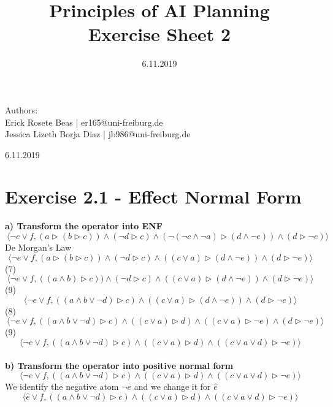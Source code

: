 \documentclass[12pt,a4paper]{article}
\title{\textbf{Principles of AI Planning
		\\{\Large Exercise Sheet 2}}}
\date{6.11.2019}
\begin{document}
	\begin{flushleft}
		Authors:\\
		Erick Rosete Beas | er165@uni-freiburg.de\\
		Jessica Lizeth Borja Diaz | jb986@uni-freiburg.de\\
	\end{flushleft}
	{\let\newpage\relax\maketitle}
	\begin{center} 
		\large 6.11.2019 
	\end{center}

	\section*{Exercise 2.1 - Effect Normal Form}
	\textbf{a) Transform the operator into ENF}\\
	\[\ \langle\neg e \lor f, (a \triangleright (b \triangleright c))  \land (\neg d \triangleright c) \land (\neg(\neg c \land \neg a) \triangleright (d \land \neg e)) \land (d \triangleright \neg e) \rangle \]	
	De Morgan's Law
	\[\ \langle\neg e \lor f, (a \triangleright (b \triangleright c))  \land (\neg d \triangleright c) \land ((c \lor a) \triangleright (d \land \neg e)) \land (d \triangleright \neg e) \rangle \]
	(7)
	\[\ \langle\neg e \lor f, ((a \land b) \triangleright c))  \land (\neg d \triangleright c) \land ((c \lor a) \triangleright (d \land \neg e)) \land (d \triangleright \neg e) \rangle \]
	(9)
	\[\ \langle\neg e \lor f, ((a \land b \lor \neg d) \triangleright c) \land ((c \lor a) \triangleright (d \land \neg e)) \land (d \triangleright \neg e) \rangle \]
	(8)
	\[\ \langle\neg e \lor f, ((a \land b \lor \neg d) \triangleright c) \land ((c \lor a) \triangleright d) \land ((c \lor a) \triangleright \neg e) \land (d \triangleright \neg e) \rangle \]
	(9)
	\[\ \langle\neg e \lor f, ((a \land b \lor \neg d) \triangleright c) \land ((c \lor a) \triangleright d) \land ((c \lor a \lor d) \triangleright \neg e) \rangle \]\\
	\textbf{b) Transform the operator into positive normal form}\\
	\[\ \langle\neg e \lor f, ((a \land b \lor \neg d) \triangleright c) \land ((c \lor a) \triangleright d) \land ((c \lor a \lor d) \triangleright \neg e) \rangle \]
	We identify the negative atom $\neg e$ and we change it for $\hat{e}$
	\[\ \langle \hat{e} \lor f, ((a \land b \lor \neg d) \triangleright c) \land ((c \lor a) \triangleright d) \land ((c \lor a \lor d) \triangleright \neg e) \rangle \]
\end{document}
